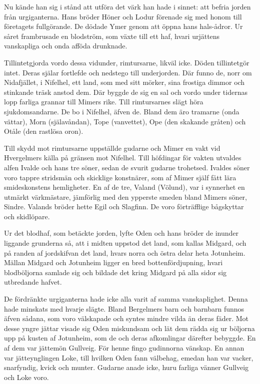 
Nu kände han sig i stånd att utföra det värk han hade i sinnet: att
befria jorden från urgiganterna. Hans bröder Höner och Lodur förenade
sig med honom till företagets fullgörande. De dödade Ymer genom att
öppna hans hals-ådror. Ur såret frambrusade en blodström, som växte till
ett haf, hvari urjättens vanskapliga och onda afföda drunknade.

Tillintetgjorda vordo dessa vidunder, rimtursarne, likväl icke. Döden
tillintetgör intet. Deras själar fortlefde och nedstego till
underjorden. Där funno de, norr om Nidafjället, i Nifelhel, ett land,
som med sitt mörker, sina frostiga dimmor och stinkande träsk anstod
dem. Där byggde de sig en sal och vordo under tidernas lopp farliga
grannar till Mimers rike. Till rimtursarnes slägt höra sjukdomsandarne.
De bo i Nifelhel, äfven de. Bland dem äro tramarne (onda vättar), Morn
(själavåndan), Tope (vanvettet), Ope (den skakande gråten) och Otåle
(den rastlösa oron).

Till skydd mot rimtursarne uppställde gudarne och Mimer en vakt vid
Hvergelmers källa på gränsen mot Nifelhel. Till höfdingar för vakten
utvaldes alfen Ivalde och hans tre söner, sedan de svurit gudarne
trohetsed. Ivaldes söner voro tappre stridsmän och skicklige konstnärer,
som af Mimer själf fått lära smideskonstens hemligheter. En af de tre,
Valand (Völund), var i synnerhet en utmärkt värkmästare, jämförlig
med den ypperste smeden bland Mimers söner, Sindre. Valands bröder hette
Egil och Slagfinn. De voro förträfflige bågskyttar och skidlöpare.



Ur det blodhaf, som betäckte jorden, lyfte Oden och hans bröder de
inunder liggande grunderna så, att i midten uppstod det land, som kallas
Midgard, och på randen af jordskifvan det land, hvars norra och östra
delar heta Jotunheim. Mällan Midgard och Jotunheim ligger en bred
bottenfördjupning, hvari blodböljorna samlade sig och bildade det kring
Midgard på alla sidor sig utbredande hafvet.

De fördränkte urgiganterna hade icke alla varit af samma vanskaplighet.
Denna hade minskats med hvarje slägte. Bland Bergelmers barn och
barnbarn funnos äfven sådana, som voro välskapade och syntes mindre
vilda än deras fäder. Mot desse yngre jättar visade sig Oden miskundsam
och lät dem rädda sig ur böljorna upp på kusten af Jotunheim, som de och
deras afkomlingar därefter bebyggde. En af dem var jättemön Gullveig.
För henne fingo gudinnorna vänskap. En annan var jätteynglingen Loke,
till hvilken Oden fann välbehag, emedan han var vacker, snarfyndig,
kvick och munter. Gudarne anade icke, huru farliga vänner Gullveig och
Loke voro.


